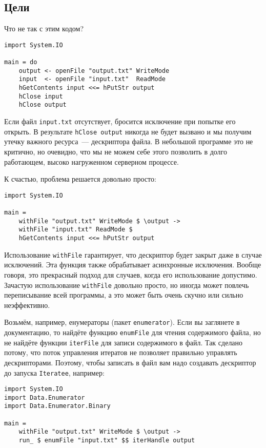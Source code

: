 \subsection{Цели}
Что не так с этим кодом?
\begin{lstlisting}
import System.IO

main = do
    output <- openFile "output.txt" WriteMode
    input  <- openFile "input.txt"  ReadMode
    hGetContents input <<= hPutStr output
    hClose input
    hClose output
\end{lstlisting}

Если файл \verb*|input.txt| отсутствует, бросится исключение при попытке его открыть. В
результате \lstinline'hClose output' никогда не будет вызвано и мы получим утечку важного ресурса~--- дескриптора файла. В небольшой программе это не критично, но очевидно, что мы не
можем себе этого позволить в долго работающем, высоко нагруженном серверном процессе.

К счастью, проблема решается довольно просто:
\begin{lstlisting}
import System.IO

main =
    withFile "output.txt" WriteMode $ \output ->
    withFile "input.txt" ReadMode $ 
    hGetContents input <<= hPutStr output
\end{lstlisting}

Использование \lstinline'withFile' гарантирует, что дескриптор будет закрыт даже в
случае
исключений. Эта функция также обрабатывает асинхронные исключения. Вообще говоря, это прекрасный
подход для случаев, когда его использование допустимо. Зачастую использование \lstinline'withFile' довольно просто, но иногда может повлечь переписывание всей программы, а это может быть очень скучно или сильно неэффективно.

Возьмём, например, енумераторы (пакет \texttt{enumerator}). Если вы заглянете в документацию, то найдёте функцию
\lstinline'enumFile' для чтения содержимого файла, но не найдёте функции
\lstinline'iterFile' для записи
содержимого в файл. Так сделано потому, что поток управления итератов не позволяет
правильно управлять дескрипторами. Поэтому, чтобы записать в файл вам надо создавать
дескриптор до запуска \lstinline{Iteratee}, например:

\begin{lstlisting}
import System.IO
import Data.Enumerator
import Data.Enumerator.Binary

main =
    withFile "output.txt" WriteMode $ \output ->
    run_ $ enumFile "input.txt" $$ iterHandle output
\end{lstlisting}

